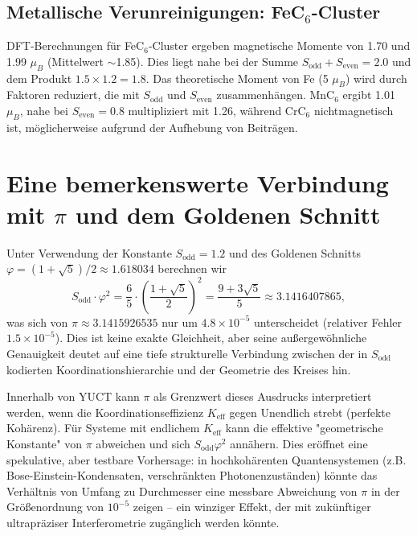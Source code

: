 \documentclass[12pt,a4paper]{article}
\begin{document}
	\subsection{Metallische Verunreinigungen: FeC\({}_6\)-Cluster}
	DFT-Berechnungen für FeC\({}_6\)-Cluster ergeben magnetische Momente von 1.70 und 1.99 \(\mu_B\) (Mittelwert \(\sim\)1.85). Dies liegt nahe bei der Summe \(S_{\text{odd}}+S_{\text{even}}=2.0\) und dem Produkt \(1.5\times1.2=1.8\). Das theoretische Moment von Fe (5 \(\mu_B\)) wird durch Faktoren reduziert, die mit \(S_{\text{odd}}\) und \(S_{\text{even}}\) zusammenhängen. MnC\({}_6\) ergibt 1.01 \(\mu_B\), nahe bei \(S_{\text{even}}=0.8\) multipliziert mit 1.26, während CrC\({}_6\) nichtmagnetisch ist, möglicherweise aufgrund der Aufhebung von Beiträgen.
	
	\section{Eine bemerkenswerte Verbindung mit \(\pi\) und dem Goldenen Schnitt}
	\label{sec:pi_relation}
	
	Unter Verwendung der Konstante \(S_{\text{odd}} = 1.2\) und des Goldenen Schnitts \(\varphi = (1+\sqrt{5})/2 \approx 1.618034\) berechnen wir
	\[
	S_{\text{odd}} \cdot \varphi^2 = \frac{6}{5} \cdot \left(\frac{1+\sqrt{5}}{2}\right)^2 = \frac{9+3\sqrt{5}}{5} \approx 3.1416407865,
	\]
	was sich von \(\pi \approx 3.1415926535\) nur um \(4.8\times10^{-5}\) unterscheidet (relativer Fehler \(1.5\times10^{-5}\)). Dies ist keine exakte Gleichheit, aber seine außergewöhnliche Genauigkeit deutet auf eine tiefe strukturelle Verbindung zwischen der in \(S_{\text{odd}}\) kodierten Koordinationshierarchie und der Geometrie des Kreises hin.
	
	Innerhalb von YUCT kann \(\pi\) als Grenzwert dieses Ausdrucks interpretiert werden, wenn die Koordinationseffizienz \(K_{\text{eff}}\) gegen Unendlich strebt (perfekte Kohärenz). Für Systeme mit endlichem \(K_{\text{eff}}\) kann die effektive "geometrische Konstante" von \(\pi\) abweichen und sich \(S_{\text{odd}}\varphi^2\) annähern. Dies eröffnet eine spekulative, aber testbare Vorhersage: in hochkohärenten Quantensystemen (z.B. Bose-Einstein-Kondensaten, verschränkten Photonenzuständen) könnte das Verhältnis von Umfang zu Durchmesser eine messbare Abweichung von \(\pi\) in der Größenordnung von \(10^{-5}\) zeigen -- ein winziger Effekt, der mit zukünftiger ultrapräziser Interferometrie zugänglich werden könnte.
	
\end{document}

